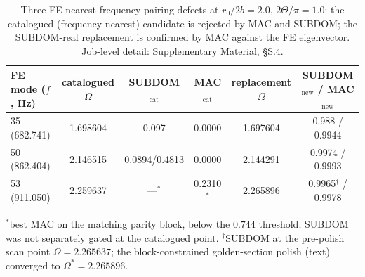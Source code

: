 \documentclass[11pt]{article}
\begin{document}
\begin{table}[!htb]\centering\small
\caption{Three FE nearest-frequency pairing defects at $r_0/2b=2.0$,
$2\Theta/\pi=1.0$: the catalogued (frequency-nearest) candidate is
rejected by MAC and SUBDOM; the SUBDOM-real replacement is confirmed by
MAC against the FE eigenvector. Job-level detail: Supplementary
Material, §S.4.}
\label{tab:pairingdefects}
\setlength{\tabcolsep}{4pt}
\begin{tabular}{lccccc}
\toprule
FE mode ($f$, Hz) & catalogued $\Omega$ & SUBDOM$_{\mathrm{cat}}$ & MAC$_{\mathrm{cat}}$ & replacement $\Omega$ & SUBDOM$_{\mathrm{new}}$ / MAC$_{\mathrm{new}}$\\
\midrule
35 (682.741) & 1.698604 & 0.097 & 0.0000 & 1.697604 & 0.988 / 0.9944\\
50 (862.404) & 2.146515 & 0.0894/0.4813 & 0.0000 & 2.144291 & 0.9974 / 0.9993\\
53 (911.050) & 2.259637 & ---$^{\ast}$ & 0.2310$^{\ast}$ & 2.265896 & 0.9965$^{\dagger}$ / 0.9978\\
\bottomrule
\end{tabular}

\vspace{0.25em}
{\footnotesize $^\ast$best MAC on the matching parity block, below the
$0.744$ threshold; SUBDOM was not separately gated at the catalogued
point. $^\dagger$SUBDOM at the pre-polish scan point $\Omega=2.265637$;
the block-constrained golden-section polish (text) converged to
$\Omega^{*}=2.265896$.}
\setlength{\tabcolsep}{6pt}
\end{table}
\end{document}
